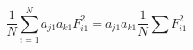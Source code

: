 \begin{equation}
	\frac{1}{N}\sum_{i=1}^{N}a_{j1}a_{k1}F_{i1}^2=a_{j1}a_{k1}\frac{1}{N}\sum F_{i1}^2
\end{equation}
